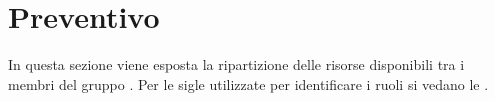 \section{Preventivo}
In questa sezione viene esposta la ripartizione delle risorse disponibili tra i membri del gruppo \Gruppo{}. Per le sigle utilizzate per identificare i ruoli si vedano le \NdPv{}.

\newpage

\newpage

\newpage

\newpage
